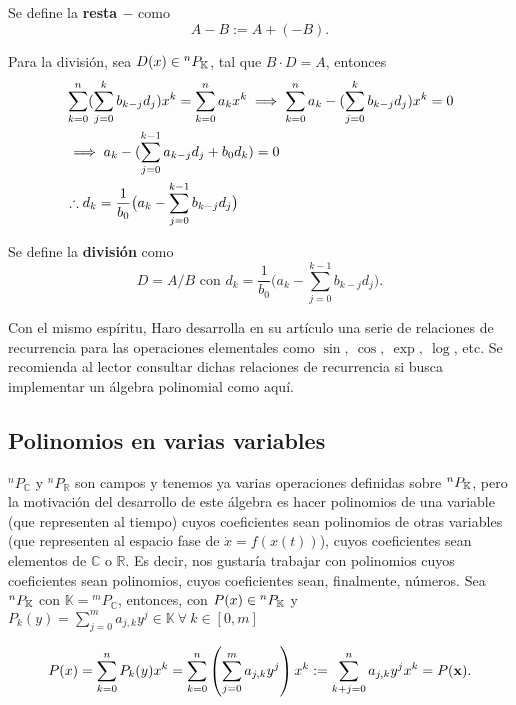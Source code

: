 Se define la \textbf{resta $-$} como
\begin{equation}
 A - B := A + (-B).
 \label{eq:polisub}
\end{equation}


Para la división, sea $D(x) \in {^{n}P_{\mathbb{K}}}$, tal que  $B \cdot D = A $,  entonces 
\begin{align*}
 & \sum_{k=0}^n  (\sum_{j=0}^k b_{k-j} d_j )  x^k = \sum_{k=0}^n  a_k  x^k \implies \sum_{k=0}^n  a_k - (\sum_{j=0}^k b_{k-j} d_j )  x^k = 0 \\ 
 &\implies a_k - ( \sum_{j=0}^{k-1}a_{k-j} d_j + b_0 d_k ) = 0 \\
 & \therefore d_k = \frac{1}{b_0} \big( a_k - \sum_{j=0}^{k-1} b_{k-j} d_j \big)  
\end{align*}

Se define la \textbf{división} como
\begin{equation}
 D = A/B \text{ con } d_k = \frac{1}{b_0} \big( a_k - \sum_{j=0}^{k-1} b_{k-j} d_j \big).
 \label{eq:polidiv}
\end{equation}

Con el mismo espíritu, Haro desarrolla en su artículo \cite{Haro2009} una serie de relaciones de recurrencia para las operaciones elementales como $\sin, \ \cos, \  \exp, \ \log$, etc. Se recomienda al lector consultar dichas relaciones de recurrencia si busca implementar un álgebra polinomial como aquí.


\subsection{Polinomios en varias variables}
\label{sec:pknN}

$^nP_{\mathbb{C}}$ y $^nP_{\mathbb{R}}$ son campos y tenemos ya varias operaciones definidas sobre ${^{n}P_{\mathbb{K}}}$, pero la motivación del desarrollo de este álgebra es hacer polinomios de una variable (que representen al tiempo) cuyos coeficientes sean polinomios de otras variables (que representen al espacio fase de $\dot{x} = f(x(t))$), cuyos coeficientes sean elementos de $\mathbb{C}$ o $\mathbb{R}$. Es decir, nos gustaría trabajar con polinomios cuyos coeficientes sean polinomios, cuyos coeficientes sean, finalmente, números.
Sea  ${^{n}P_{\mathbb{K}}}$ con $\mathbb{K} = {{^{m}P_{\mathbb{C}}}}$, entonces, con $P(x) \in {^{n}P_{\mathbb{K}}}$ y $P_k(y) = \sum_{j=0}^m a_{j,k}y^j \in \mathbb{K} \ \forall \  k \in [0,m]$

\begin{equation}
 P(x) =  \sum_{k=0}^n P_k(y) x^k = \sum_{k=0}^n \left( \sum_{j=0}^m a_{j,k} y^j \right) x^k := \sum_{k+j=0}^n a_{j,k} y^j x^k = P(\mathbf{x}).
\label{eq:pkn2}
\end{equation}

